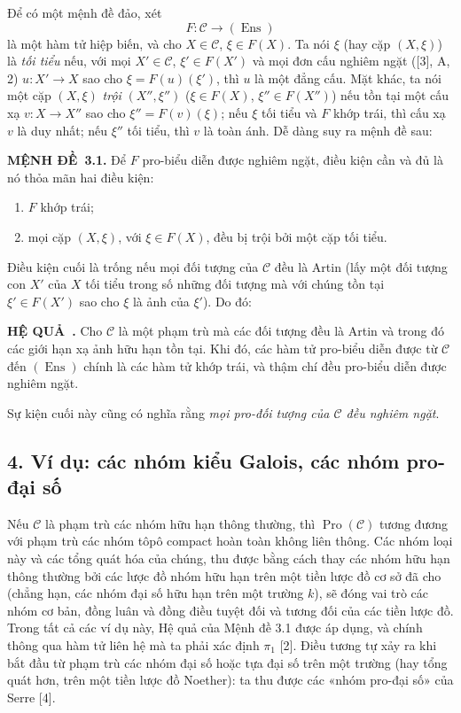 \documentclass[11pt,twoside,openany]{book}
\numberwithin{equation}{section}
\newcommand{\src}[1]{%
  \phantomsection\hypertarget{src:\fgasourceid:#1}{}%
  \marginpar{\raggedleft\footnotesize\sffamily #1}%
}
\newcommand{\fgasourceid}{unset}
\newcommand{\result}[2]{\par\medskip\noindent\textbf{#1\if\relax\detokenize{#2}\relax\else\ #2\fi.}\quad}
\begin{document}
Để có một mệnh đề đảo, xét
\[
  F:\mathcal C\longrightarrow(\operatorname{Ens})
\]
là một hàm tử hiệp biến, và cho $X\in\mathcal C$, $\xi\in F(X)$. Ta nói
$\xi$ (hay cặp \src{374}$(X,\xi)$) là \emph{tối tiểu} nếu, với mọi
$X'\in\mathcal C$, $\xi'\in F(X')$ và mọi đơn cấu nghiêm ngặt ([3], A, 2)
$u:X'\longrightarrow X$ sao cho $\xi=F(u)(\xi')$, thì $u$ là một đẳng cấu.
Mặt khác, ta nói một cặp $(X,\xi)$ \emph{trội} $(X'',\xi'')$
($\xi\in F(X)$, $\xi''\in F(X'')$) nếu tồn tại một cấu xạ
$v:X\longrightarrow X''$ sao cho $\xi''=F(v)(\xi)$; nếu $\xi$ tối tiểu và
$F$ khớp trái, thì cấu xạ $v$ là duy nhất; nếu $\xi''$ tối tiểu, thì $v$ là
toàn ánh. Dễ dàng suy ra mệnh đề sau:

\result{MỆNH ĐỀ}{3.1} Để $F$ pro-biểu diễn được nghiêm ngặt, điều kiện cần và
đủ là nó thỏa mãn hai điều kiện:
\begin{enumerate}
\item[(i)] $F$ khớp trái;
\item[(ii)] mọi cặp $(X,\xi)$, với $\xi\in F(X)$, đều bị trội bởi một cặp
tối tiểu.
\end{enumerate}

Điều kiện cuối là trống nếu mọi đối tượng của $\mathcal C$ đều là Artin (lấy
một đối tượng con $X'$ của $X$ tối tiểu trong số những đối tượng mà với chúng
tồn tại $\xi'\in F(X')$ sao cho $\xi$ là ảnh của $\xi'$). Do đó:

\result{HỆ QUẢ}{} Cho $\mathcal C$ là một phạm trù mà các đối tượng đều là
Artin và trong đó các giới hạn xạ ảnh hữu hạn tồn tại. Khi đó, các hàm tử
pro-biểu diễn được từ $\mathcal C$ đến $(\operatorname{Ens})$ chính là các
hàm tử khớp trái, và thậm chí đều pro-biểu diễn được nghiêm ngặt.

Sự kiện cuối này cũng có nghĩa rằng \emph{mọi pro-đối tượng của $\mathcal C$
đều nghiêm ngặt}.

\subsection*{4. Ví dụ: các nhóm kiểu Galois, các nhóm pro-đại số}

Nếu $\mathcal C$ là phạm trù các nhóm hữu hạn thông thường, thì
$\operatorname{Pro}(\mathcal C)$ tương đương với phạm trù các nhóm tôpô
compact hoàn toàn không liên thông. Các nhóm loại này và các tổng quát hóa
của chúng, thu được bằng cách thay các nhóm hữu hạn thông thường bởi các lược
đồ nhóm hữu hạn trên một tiền lược đồ cơ sở đã cho (chẳng hạn, các nhóm đại
số hữu hạn trên một trường $k$), sẽ đóng vai trò các nhóm cơ bản, đồng luân
và đồng điều tuyệt đối và tương đối của các tiền lược đồ. Trong tất cả các
ví dụ này, Hệ quả của Mệnh đề 3.1 được áp dụng, và chính thông qua hàm tử liên
hệ mà ta phải xác định $\pi_1$ [2]. Điều tương tự xảy ra khi bắt đầu từ phạm
trù các nhóm đại số hoặc tựa đại số trên một trường (hay tổng quát hơn, trên
một tiền lược đồ Noether): ta thu được các «nhóm pro-đại số» của Serre [4].
\end{document}
